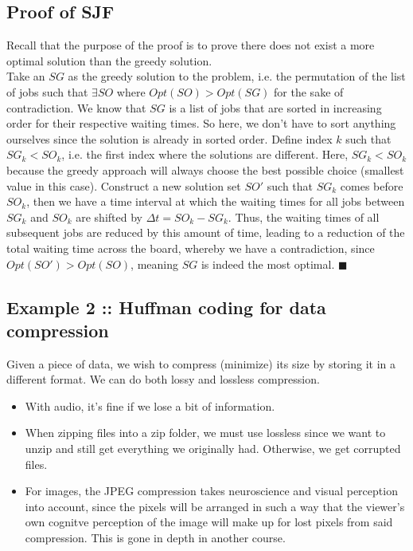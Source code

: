 \documentclass[12pt]{book}
\begin{document}
\subsection*{Proof of SJF}
Recall that the purpose of the proof is to prove there does not exist a more optimal solution than the greedy solution.\\
Take an $SG$ as the greedy solution to the problem, i.e. the permutation of the list of jobs such that $\exists SO$ where $Opt(SO)>Opt(SG)$ for the sake of contradiction. We know that $SG$ is a list of jobs that are sorted in increasing order for their respective waiting times. So here, we don't have to sort anything ourselves since the solution is already in sorted order. Define index $k$ such that $SG_k< SO_k$, i.e. the first index where the solutions are different. Here, $SG_k<SO_k$ because the greedy approach will always choose the best possible choice (smallest value in this case). Construct a new solution set $SO'$ such that $SG_k$ comes before $SO_k$, then we have a time interval at which the waiting times for all jobs between $SG_k$ and $SO_k$ are shifted by $\Delta t=SO_k-SG_k$. Thus, the waiting times of all subsequent jobs are reduced by this amount of time, leading to a reduction of the total waiting time across the board, whereby we have a contradiction, since $Opt(SO')>Opt(SO)$, meaning $SG$ is indeed the most optimal. $\blacksquare$

\subsection*{Example 2 :: Huffman coding for data compression}

Given a piece of data, we wish to compress (minimize) its size by storing it in a different format. We can do both lossy and lossless compression.

\begin{itemize}
    \item With audio, it's fine if we lose a bit of information.
    \item When zipping files into a zip folder, we must use lossless since we want to unzip and still get everything we originally had. Otherwise, we get corrupted files. 
    \item For images, the JPEG compression takes neuroscience and visual perception into account, since the pixels will be arranged in such a way that the viewer's own cognitve perception of the image will make up for lost pixels from said compression. This is gone in depth in another course.
\end{itemize}
\end{document}
